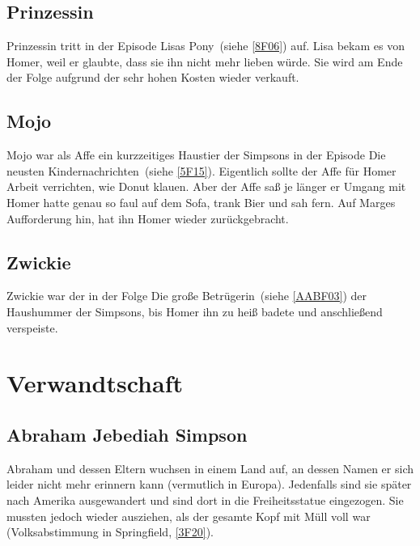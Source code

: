 \subsection{Prinzessin}
Prinzessin tritt in der Episode \glqq Lisas Pony\grqq\ (siehe \ref{8F06}) auf. Lisa bekam es von Homer, weil er glaubte, dass sie ihn nicht mehr lieben würde. Sie wird am Ende der Folge aufgrund der sehr hohen Kosten wieder verkauft.

\subsection{Mojo}
Mojo war als Affe ein kurzzeitiges Haustier der Simpsons in der Episode \glqq Die neusten Kindernachrichten\grqq\ (siehe \ref{5F15}). Eigentlich sollte der Affe für Homer Arbeit verrichten, wie Donut klauen. Aber der Affe saß je länger er Umgang mit Homer hatte genau so faul auf dem Sofa, trank Bier und sah fern. Auf Marges Aufforderung hin, hat ihn Homer wieder zurückgebracht. 

\subsection{Zwickie}
Zwickie war der in der Folge \glqq Die große Betrügerin\grqq\ (siehe \ref{AABF03}) der Haushummer der Simpsons, bis Homer ihn zu heiß badete und anschließend verspeiste.



\section{Verwandtschaft}

\subsection{Abraham Jebediah Simpson}\label{AbeSimpson}
Abraham und dessen Eltern wuchsen in einem Land auf, an dessen Namen er sich leider nicht mehr erinnern kann (vermutlich in Europa). Jedenfalls sind sie später nach Amerika ausgewandert und sind dort in die Freiheitsstatue eingezogen. Sie mussten jedoch wieder ausziehen, als der gesamte Kopf mit Müll voll war (\glqq Volksabstimmung in Springfield\grqq , \ref{3F20}). 

